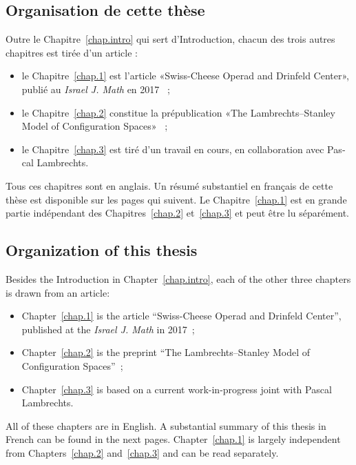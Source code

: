 \cleardoublepage
\begin{french}
  \section*{Organisation de cette thèse}

  Outre le Chapitre~\ref{chap.intro} qui sert d'Introduction, chacun des trois autres chapitres est tirée d'un article :
  \begin{itemize}
  \item le Chapitre~\ref{chap.1} est l'article «Swiss-Cheese Operad and Drinfeld Center», publié au \textit{Israel J. Math} en 2017~\cite{Idrissi2017} ;
  \item le Chapitre~\ref{chap.2} constitue la prépublication «The Lambrechts--Stanley Model of Configuration Spaces»~\cite{Idrissi2016} ;
  \item le Chapitre~\ref{chap.3} est tiré d'un travail en cours, en collaboration avec Pascal Lambrechts.
  \end{itemize}

  Tous ces chapitres sont en anglais.
  Un résumé substantiel en français de cette thèse est disponible sur les pages qui suivent.
  Le Chapitre~\ref{chap.1} est en grande partie indépendant des Chapitres~\ref{chap.2} et~\ref{chap.3} et peut être lu séparément.
\end{french}

\bigskip
\noindent\hrulefill{}

\disfrpt{}
\begin{english}
  \section*{Organization of this thesis}

  Besides the Introduction in Chapter~\ref{chap.intro}, each of the other three chapters is drawn from an article:
  \begin{itemize}
  \item Chapter~\ref{chap.1} is the article ``Swiss-Cheese Operad and Drinfeld Center'', published at the \textit{Israel J. Math} in 2017~\cite{Idrissi2017};
  \item Chapter~\ref{chap.2} is the preprint ``The Lambrechts--Stanley Model of Configuration Spaces''~\cite{Idrissi2016};
  \item Chapter~\ref{chap.3} is based on a current work-in-progress joint with Pascal Lambrechts.
  \end{itemize}

  All of these chapters are in English.
  A substantial summary of this thesis in French can be found in the next pages.
  Chapter~\ref{chap.1} is largely independent from Chapters~\ref{chap.2} and~\ref{chap.3} and can be read separately.
\end{english}

